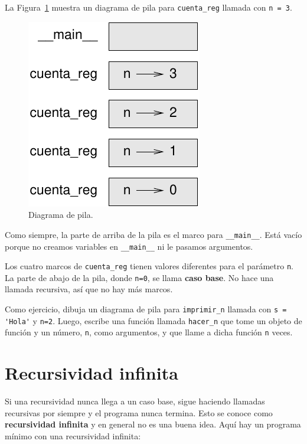 \documentclass[10pt]{book}
\begin{document}
La Figura~\ref{fig.stack2} muestra un diagrama de pila para {\tt cuenta\_reg} llamada con
{\tt n = 3}.

\begin{figure}
\centerline
{\includegraphics[scale=0.8]{figs/stack2.pdf}}
\caption{Diagrama de pila.}
\label{fig.stack2}
\end{figure}


Como siempre, la parte de arriba de la pila es el marco para \verb"__main__".
Está vacío porque no creamos variables en
\verb"__main__" ni le pasamos argumentos.

Los cuatro marcos de {\tt cuenta\_reg} tienen valores diferentes para el
parámetro {\tt n}.  La parte de abajo de la pila, donde {\tt n=0}, se
llama {\bf caso base}.  No hace una llamada recursiva, así que
no hay más marcos.

Como ejercicio, dibuja un diagrama de pila para \verb"imprimir_n" llamada con
\verb"s = 'Hola'" y {\tt n=2}.
Luego, escribe una función llamada \verb"hacer_n" que tome un objeto de
función y un número, {\tt n}, como argumentos, y que llame
a dicha función {\tt n} veces.


\section{Recursividad infinita}

Si una recursividad nunca llega a un caso base, sigue haciendo
llamadas recursivas por siempre y el programa nunca termina.  Esto se
conoce como {\bf recursividad infinita} y en general no es
una buena idea.  Aquí hay un programa mínimo con una recursividad infinita:
\end{document}
